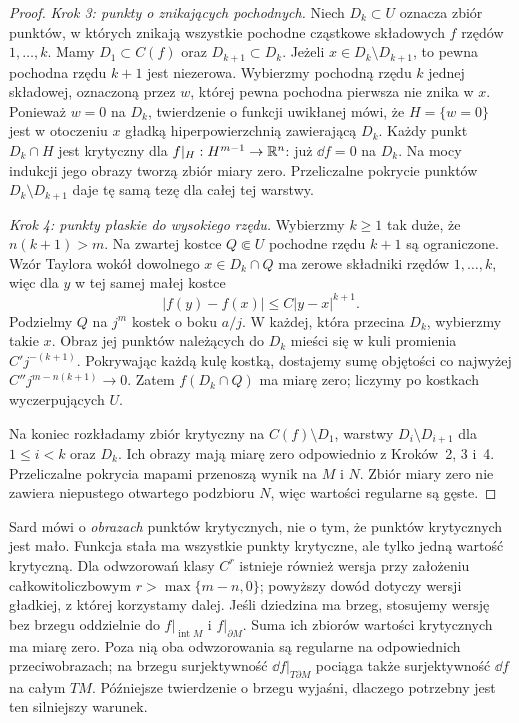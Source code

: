 \begin{proof}
\emph{Krok 3: punkty o znikających pochodnych.}
Niech $D_k\subset U$ oznacza zbiór punktów,
w których znikają wszystkie pochodne cząstkowe
składowych $f$ rzędów $1,\ldots,k$.
Mamy $D_1\subset C(f)$ oraz
$D_{k+1}\subset D_k$. Jeżeli
$x\in D_k\setminus D_{k+1}$, to pewna pochodna
rzędu $k+1$ jest niezerowa. Wybierzmy
pochodną rzędu $k$ jednej składowej, oznaczoną
przez $w$, której pewna pochodna pierwsza
nie znika w $x$. Ponieważ $w=0$ na $D_k$,
twierdzenie o funkcji uwikłanej mówi, że
$H=\{w=0\}$ jest w otoczeniu $x$ gładką
hiperpowierzchnią zawierającą $D_k$.
Każdy punkt $D_k\cap H$ jest krytyczny dla
$f|_H:H^{m-1}\to\mathbb{R}^n$: już $\dd f=0$
na $D_k$. Na mocy indukcji jego obrazy
tworzą zbiór miary zero. Przeliczalne
pokrycie punktów $D_k\setminus D_{k+1}$
daje tę samą tezę dla całej tej warstwy.

\emph{Krok 4: punkty płaskie do wysokiego rzędu.}
Wybierzmy $k\geq1$ tak duże, że
$n(k+1)>m$. Na zwartej kostce $Q\Subset U$
pochodne rzędu $k+1$ są ograniczone.
Wzór Taylora wokół dowolnego $x\in D_k\cap Q$
ma zerowe składniki rzędów $1,\ldots,k$,
więc dla $y$ w tej samej małej kostce
\[
 |f(y)-f(x)|\leq C|y-x|^{k+1}.
\]
Podzielmy $Q$ na $j^m$ kostek o boku $a/j$.
W każdej, która przecina $D_k$, wybierzmy
takie $x$. Obraz jej punktów należących
do $D_k$ mieści się w kuli promienia
$C'j^{-(k+1)}$. Pokrywając każdą kulę
kostką, dostajemy sumę objętości
co najwyżej $C''j^{m-n(k+1)}\to0$.
Zatem $f(D_k\cap Q)$ ma miarę zero;
liczymy po kostkach wyczerpujących $U$.

Na koniec rozkładamy zbiór krytyczny na
$C(f)\setminus D_1$, warstwy
$D_i\setminus D_{i+1}$ dla $1\leq i<k$
oraz $D_k$. Ich obrazy mają miarę zero
odpowiednio z Kroków~2, 3 i~4.
Przeliczalne pokrycia mapami przenoszą
wynik na $M$ i $N$. Zbiór miary zero
nie zawiera niepustego otwartego podzbioru
$N$, więc wartości regularne są gęste.
\end{proof}

\begin{uwaga}
Sard mówi o \emph{obrazach} punktów krytycznych,
nie o tym, że punktów krytycznych jest mało.
Funkcja stała ma wszystkie punkty krytyczne,
ale tylko jedną wartość krytyczną.
Dla odwzorowań klasy $C^r$ istnieje również
wersja przy założeniu całkowitoliczbowym
$r>\max\{m-n,0\}$; powyższy dowód dotyczy
wersji gładkiej, z której korzystamy dalej.
Jeśli dziedzina ma brzeg, stosujemy wersję bez brzegu
oddzielnie do $f|_{\operatorname{int}M}$ i
$f|_{\partial M}$. Suma ich zbiorów wartości krytycznych
ma miarę zero. Poza nią oba odwzorowania są regularne na
odpowiednich przeciwobrazach; na brzegu surjektywność
$\dd f|_{T\partial M}$ pociąga także surjektywność
$\dd f$ na całym $TM$. Późniejsze twierdzenie o brzegu
wyjaśni, dlaczego potrzebny jest ten silniejszy warunek.
\end{uwaga}

